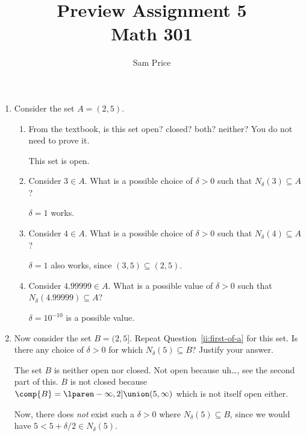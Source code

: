 \documentclass{article}
\author{Sam Price}
\date{}
\title{Preview Assignment 5\\\Large{Math 301}}
\begin{document}
\maketitle

\begin{enumerate}

\item Consider the set $A = (2, 5)$.
        \begin{enumerate}
          \item\label{ii:first-of-a} From the textbook, is this set open? closed? both? neither? You do not need to prove it.

                This set is open.

          \item Consider $3 \in A$. What is a possible choice of $\delta > 0$ such that $N_{\delta}(3) \subseteq A$?

                $\delta = 1$ works.

          \item Consider $4 \in A$. What is a possible choice of $\delta > 0$ such that $N_{\delta}(4) \subseteq A$?

                $\delta = 1$ also works, since $(3, 5) \subseteq (2, 5)$.

          \item Consider $4.99999 \in A$. What is a possible value of $\delta > 0$ such that $N_{\delta}(4.99999) \subseteq A$?

                $\delta = 10^{-10}$ is a possible value.
        \end{enumerate}





  \item Now consider the set $B = \lparen 2, 5 \rbrack$. Repeat Question~\ref{ii:first-of-a} for this set. Is there any choice of $\delta > 0$ for which $N_{\delta}(5) \subseteq B$? Justify your answer.

        The set $B$ is neither open nor closed. Not open because uh\ldots, see the second part of this. $B$ is not closed because
        $\comp{B} = \lparen -\infty, 2 \rbrack \union (5, \infty)$ which is not itself open either.

        Now, there does \emph{not} exist such a $\delta > 0$ where $N_{\delta}(5) \subseteq B$,
        since we would have $5 < 5 + \delta/2 \in N_{\delta}(5)$.






\end{enumerate}
\end{document}

